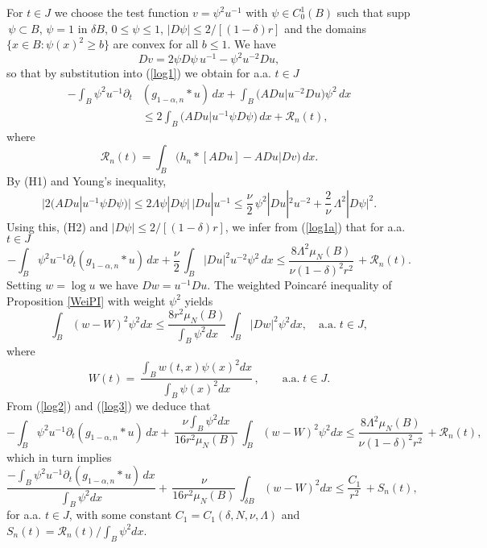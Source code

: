 \documentclass[10pt]{article}
\begin{document}
For $t\in J$ we choose the test function $v=\psi^2 u^{-1}$ with
$\psi\in C^1_0(B)$ such that supp$\,\psi\subset B$, $\psi=1$ in
$\delta B$, $0\le \psi \le 1$, $|D \psi|\le 2/[(1-\delta)r]$ and
the domains $\{x\in B:\psi(x)^2 \ge b\}$ are convex for all $b\le
1$. We have
\[ Dv=2\psi D\psi \,u^{-1}-\psi^2 u^{-2}Du,\]
so that by substitution into (\ref{log1}) we obtain for a.a. $t\in
J$
\begin{align} \label{log1a}
-\int_B \psi^2 u^{-1}\partial_t & (g_{1-\alpha,n}\ast
u)\,dx+\int_B\big(ADu|u^{-2}Du\big)\psi^2\,dx\nonumber\\ &\le
2\int_B\big(ADu|u^{-1}\psi D\psi\big)\,dx+\mathcal{R}_n(t),
\end{align}
where
\[
\mathcal{R}_n(t)=\int_B\big(h_n\ast [ADu]-ADu|Dv\big)\,dx.
\]
By (H1) and Young's inequality,
\[
\big|2\big(ADu|u^{-1}\psi D\psi\big)\big|\le 2\Lambda \psi
|D\psi|\,|Du| u^{-1}\le \frac{\nu}{2}\,\psi^2|Du|^2
u^{-2}+\frac{2}{\nu}\,\Lambda^2|D\psi|^2.
\]
Using this, (H2) and $|D \psi|\le 2/[(1-\delta)r]$, we infer from
(\ref{log1a}) that for a.a. $t\in J$
\begin{equation} \label{log2}
-\int_B \psi^2 u^{-1}\partial_t(g_{1-\alpha,n}\ast
u)\,dx+\frac{\nu}{2}\,\int_B |Du|^2 u^{-2} \psi^2\,dx \le \frac{8
\Lambda^2 \mu_N(B)}{\nu (1-\delta)^2 r^2}\,+\mathcal{R}_n(t).
\end{equation}
Setting $w=\log u$ we have $Dw=u^{-1} Du$. The weighted Poincar\'e
inequality of Proposition \ref{WeiPI} with weight $\psi^2$ yields
\begin{equation} \label{log3}
\int_B (w-W)^2 \psi^2 dx \le \frac{8 r^2 \mu_N(B)}{\int_B \psi^2
dx}\,\int_B |Dw|^2 \psi^2 dx,\quad \mbox{a.a.}\;t\in J,
\end{equation}
where
\[ W(t)=\,\frac{\int_B w(t,x) \psi(x)^2 dx}{\int_B \psi(x)^2
dx}\,,\quad\quad \mbox{a.a.}\;t\in J.
\]
From (\ref{log2}) and (\ref{log3}) we deduce that
\[
-\int_B \psi^2 u^{-1}\partial_t(g_{1-\alpha,n}\ast u)
\,dx+\,\frac{\nu \int_B \psi^2 dx}{16r^2 \mu_N(B)}\,\int_B (w-W)^2
\psi^2 dx \le \frac{8 \Lambda^2 \mu_N(B)}{\nu (1-\delta)^2
r^2}\,+\mathcal{R}_n(t),
\]
which in turn implies
\begin{equation} \label{log4}
\frac{-\int_B \psi^2 u^{-1}\partial_t(g_{1-\alpha,n}\ast u)
\,dx}{\int_B \psi^2 dx}+\,\frac{\nu}{16r^2 \mu_N(B)}\,\int_{\delta
B} (w-W)^2 dx \le \frac{C_1}{r^2}\,+S_n(t),
\end{equation}
for a.a. $t\in J$, with some constant
$C_1=C_1(\delta,N,\nu,\Lambda)$ and
$S_n(t)=\mathcal{R}_n(t)/\int_B \psi^2 dx$.
\end{document}
